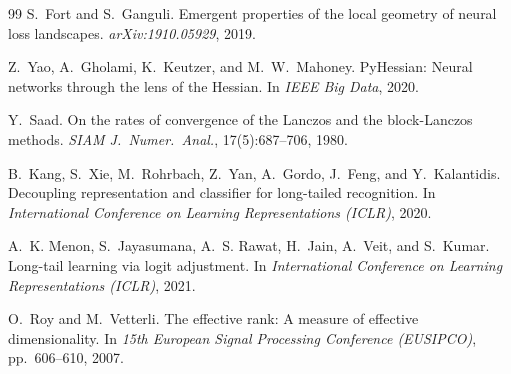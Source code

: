 \documentclass[11pt,a4paper]{article}
\begin{document}
\begin{thebibliography}{99}
S.~Fort and S.~Ganguli.
\newblock Emergent properties of the local geometry of neural loss
  landscapes.
\newblock \emph{arXiv:1910.05929}, 2019.

Z.~Yao, A.~Gholami, K.~Keutzer, and M.~W.~Mahoney.
\newblock Py{H}essian: Neural networks through the lens of the
  {H}essian.
\newblock In \emph{IEEE Big Data}, 2020.

Y.~Saad.
\newblock On the rates of convergence of the {L}anczos and the
  block-{L}anczos methods.
\newblock \emph{SIAM J.\ Numer.\ Anal.}, 17(5):687--706, 1980.

B.~Kang, S.~Xie, M.~Rohrbach, Z.~Yan, A.~Gordo, J.~Feng, and Y.~Kalantidis.
\newblock Decoupling representation and classifier for long-tailed recognition.
\newblock In \emph{International Conference on Learning Representations
  (ICLR)}, 2020.

A.~K. Menon, S.~Jayasumana, A.~S. Rawat, H.~Jain, A.~Veit, and S.~Kumar.
\newblock Long-tail learning via logit adjustment.
\newblock In \emph{International Conference on Learning Representations
  (ICLR)}, 2021.

O.~Roy and M.~Vetterli.
\newblock The effective rank: A measure of effective dimensionality.
\newblock In \emph{15th European Signal Processing Conference (EUSIPCO)},
  pp.~606--610, 2007.

\end{thebibliography}
\end{document}
